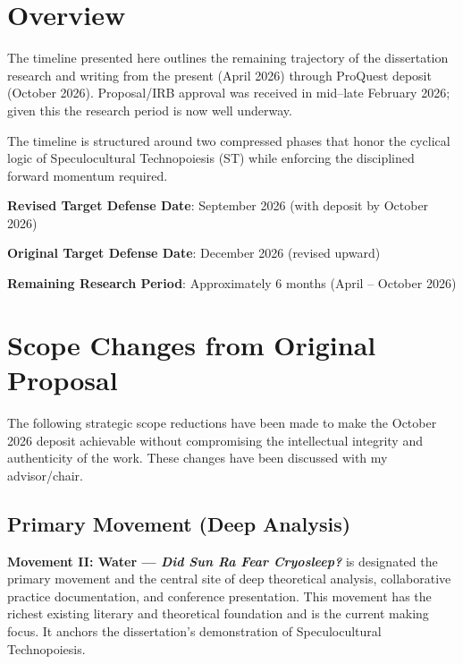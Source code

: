 \section{Overview}


The timeline presented here outlines the remaining trajectory of the dissertation research and writing from the present (April 2026) through ProQuest deposit (October 2026). Proposal/IRB approval was received in mid–late February 2026; given this the research period is now well underway.

The timeline is structured around two compressed phases that honor the cyclical logic of Speculocultural Technopoiesis (ST) while enforcing the disciplined forward momentum required.

\textbf{Revised Target Defense Date}: September 2026 (with deposit by October 2026)

\textbf{Original Target Defense Date}: December 2026 (revised upward)

\textbf{Remaining Research Period}: Approximately 6 months (April – October 2026)

\section{Scope Changes from Original Proposal}
\label{sec:scope-changes}

The following strategic scope reductions have been made to make the October 2026 deposit achievable without compromising the intellectual integrity and authenticity of the work. These changes have been discussed with my advisor/chair.

\subsection*{Primary Movement (Deep Analysis)}
\textbf{Movement II: Water — \textit{Did Sun Ra Fear Cryosleep?}} is designated the primary movement and the central site of deep theoretical analysis, collaborative practice documentation, and conference presentation. This movement has the richest existing literary and theoretical foundation and is the current making focus. It anchors the dissertation's demonstration of Speculocultural Technopoiesis.

